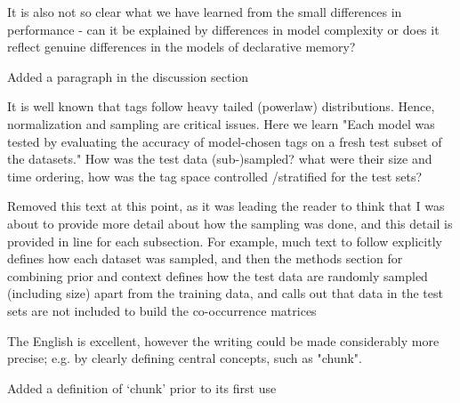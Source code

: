 \documentclass[answers,12pt]{exam}
\begin{document}
\begin{questions}
\question It is also not so clear what we have learned from the small differences in performance - can it be explained by differences in model complexity or does it reflect genuine differences in the models of declarative memory?

\begin{solution}
Added a paragraph in the discussion section
\end{solution}

\question It is well known that tags follow heavy tailed (powerlaw) distributions. Hence, normalization and sampling are critical issues. Here we learn "Each model was tested by evaluating the accuracy of model-chosen tags on a fresh test subset of the datasets." How was the test data (sub-)sampled? what were their size and time ordering, how was the tag space controlled /stratified for the test sets?

\begin{solution}
Removed this text at this point, as it was leading the reader to think that I was about to provide more detail about how the sampling was done, and this detail is provided in line for each subsection. For example, much text to follow explicitly defines how each dataset was sampled, and then the methods section for combining prior and context defines how the test data are randomly sampled (including size) apart from the training data, and calls out that data in the test sets are not included to build the co-occurrence matrices
\end{solution}

\question The English is excellent, however the writing could be made considerably more precise; e.g. by clearly defining central concepts, such as "chunk".

\begin{solution}
Added a definition of ‘chunk’ prior to its first use
\end{solution}

\end{questions}
\end{document}
